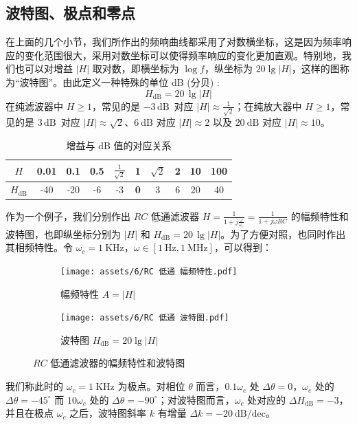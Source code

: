 \documentclass[UTF8]{report}
\def\KHz{\ \mathrm{KHz}}
\def\mHz{\ \mathrm{MHz}}
\def\db{\,\mathrm{dB}\,}
\theoremstyle{MyLineTheoremStyle} %
\theoremstyle{MyBlockTheoremStyle} %
\theoremstyle{MySubsubsectionStyle} %
\begin{document}
\subsection{波特图、极点和零点}

在上面的几个小节，我们所作出的频响曲线都采用了对数横坐标，这是因为频率响应的变化范围很大，采用对数坐标可以使得频率响应的变化更加直观。特别地，我们也可以对增益 $| H |$ 取对数，即横坐标为 $\log f$，纵坐标为 $20 \lg | H |$，这样的图称为“波特图”。由此定义一种特殊的单位 dB (分贝) :
\begin{equation}
H_{\text{dB}} = 20\, \lg |H|
\end{equation}
在纯滤波器中 $H \geqslant 1$，常见的是 $-3 \db$ 对应 $| H | \approx \frac{1}{\sqrt{2}}$；在纯放大器中 $H \geqslant 1$，常见的是 $3 \db$ 对应 $| H | \approx \sqrt{2}$、$6 \ \mathrm{dB}$ 对应 $| H | \approx 2$ 以及 $20 \ \mathrm{dB}$ 对应 $| H | \approx 10$。
\begin{table}[H]\centering
    \caption{增益与 dB 值的对应关系}
    \label{增益与 dB 值的对应关系}
\begin{tabular}{cccccccccc}\toprule
    $H$ & 0.01 & 0.1 & 0.5 & $\frac{1}{\sqrt{2}}$ & \textbf{1} & $\sqrt{2}$ & 2 & 10 & 100 \\
    \midrule
    $H_{\text{dB}}$ & -40 & -20 & -6 & -3 & \textbf{0} & 3 & 6 & 20 & 40 \\
    \bottomrule
\end{tabular}
\end{table}

作为一个例子，我们分别作出 $RC$ 低通滤波器 $H = \frac{1}{1 + j \frac{\omega}{\omega_c}} = \frac{1}{1 + j \omega RC}$ 的幅频特性和波特图，也即纵坐标分别为  $| H | $ 和 $H_{\text{dB}} = 20\, \lg | H |$。为了方便对照，也同时作出其相频特性。令 $\omega_c = 1 \KHz$，$\omega \in [1 \ \mathrm{Hz}, 1 \mHz]$，可以得到：
\begin{figure}[H]\centering
\begin{subfigure}[b]{0.5\columnwidth}\centering
    \texttt{[image: assets/6/RC 低通 幅频特性.pdf]}
    \caption{幅频特性 $A = | H |$}
\end{subfigure}\hfill
\begin{subfigure}[b]{0.5\columnwidth}\centering
    \texttt{[image: assets/6/RC 低通 波特图.pdf]}
    \caption{波特图 $H_{\text{dB}} = 20 \lg | H |$}
\end{subfigure}
\caption{$RC$ 低通滤波器的幅频特性和波特图}
\end{figure}
我们称此时的 $\omega_c = 1 \KHz$ 为极点。对相位 $\theta$ 而言，$0.1 \omega_c$ 处 $\Delta \theta = 0$，$\omega_c$ 处的 $\Delta \theta = -45^\circ$ 而 $10\omega_c$ 处的 $\Delta \theta = -90^\circ$；对波特图而言，$\omega_c$ 处对应的 $\Delta H_{\text{dB}} = -3$，并且在极点 $\omega_c$ 之后，波特图斜率 $k$ 有增量 $\Delta k = -20 \ \mathrm{dB / dec}$。
\end{document}
